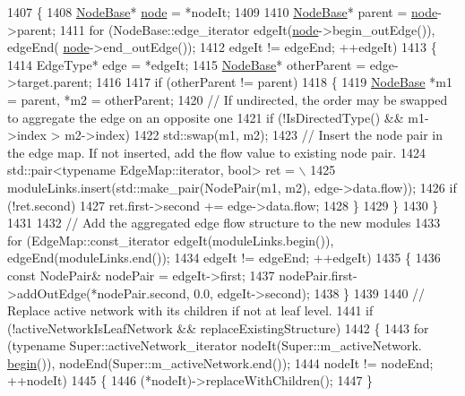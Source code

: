 \begin{DoxyCode}
1407     \{
1408         \mbox{\hyperlink{classNodeBase}{NodeBase}}* \mbox{\hyperlink{structnode}{node}} = *nodeIt;
1409 
1410         \mbox{\hyperlink{classNodeBase}{NodeBase}}* parent = \mbox{\hyperlink{structnode}{node}}->parent;
1411         \textcolor{keywordflow}{for} (NodeBase::edge\_iterator edgeIt(\mbox{\hyperlink{structnode}{node}}->begin\_outEdge()), edgeEnd(
      \mbox{\hyperlink{structnode}{node}}->end\_outEdge());
1412                 edgeIt != edgeEnd; ++edgeIt)
1413         \{
1414             EdgeType* edge = *edgeIt;
1415             \mbox{\hyperlink{classNodeBase}{NodeBase}}* otherParent = edge->target.parent;
1416 
1417             \textcolor{keywordflow}{if} (otherParent != parent)
1418             \{
1419                 \mbox{\hyperlink{classNodeBase}{NodeBase}} *m1 = parent, *m2 = otherParent;
1420                 \textcolor{comment}{// If undirected, the order may be swapped to aggregate the edge on an opposite one}
1421                 \textcolor{keywordflow}{if} (!IsDirectedType() && m1->index > m2->index)
1422                     std::swap(m1, m2);
1423                 \textcolor{comment}{// Insert the node pair in the edge map. If not inserted, add the flow value to existing
       node pair.}
1424                 std::pair<typename EdgeMap::iterator, bool> ret = \(\backslash\)
1425                     moduleLinks.insert(std::make\_pair(NodePair(m1, m2), edge->data.flow));
1426                 \textcolor{keywordflow}{if} (!ret.second)
1427                     ret.first->second += edge->data.flow;
1428             \}
1429         \}
1430     \}
1431 
1432     \textcolor{comment}{// Add the aggregated edge flow structure to the new modules}
1433     \textcolor{keywordflow}{for} (EdgeMap::const\_iterator edgeIt(moduleLinks.begin()), edgeEnd(moduleLinks.end());
1434             edgeIt != edgeEnd; ++edgeIt)
1435     \{
1436         \textcolor{keyword}{const} NodePair& nodePair = edgeIt->first;
1437         nodePair.first->addOutEdge(*nodePair.second, 0.0, edgeIt->second);
1438     \}
1439 
1440     \textcolor{comment}{// Replace active network with its children if not at leaf level.}
1441     \textcolor{keywordflow}{if} (!activeNetworkIsLeafNetwork && replaceExistingStructure)
1442     \{
1443         \textcolor{keywordflow}{for} (\textcolor{keyword}{typename} Super::activeNetwork\_iterator nodeIt(Super::m\_activeNetwork.
      \mbox{\hyperlink{namespacebegin}{begin}}()), nodeEnd(Super::m\_activeNetwork.end());
1444                 nodeIt != nodeEnd; ++nodeIt)
1445         \{
1446             (*nodeIt)->replaceWithChildren();
1447         \}

\end{DoxyCode}
